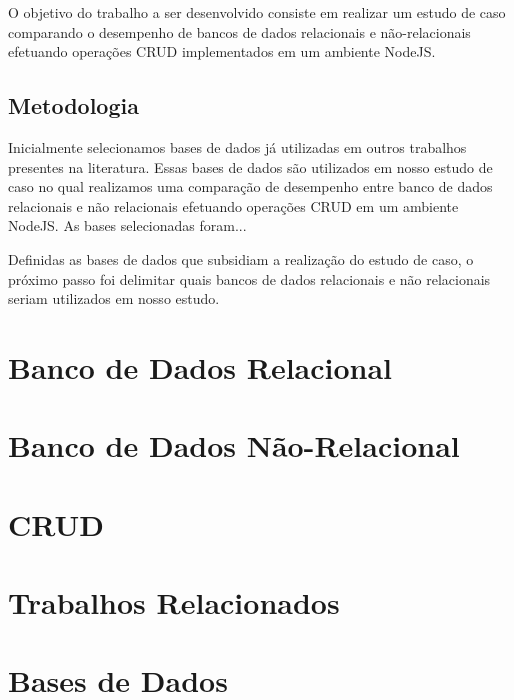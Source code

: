 \documentclass[a4paper,12pt,onecolumn,titlepage]{article}
\begin{document}
O objetivo do trabalho a ser desenvolvido consiste em realizar um estudo de caso comparando o desempenho de bancos de dados relacionais e não-relacionais efetuando operações CRUD implementados em um ambiente NodeJS.

\subsection{Metodologia}
\label{subsec:metodologia}

Inicialmente selecionamos bases de dados já utilizadas em outros trabalhos presentes na literatura. Essas bases de dados são utilizados em nosso estudo de caso no qual realizamos uma comparação de desempenho entre banco de dados relacionais e não relacionais efetuando operações CRUD em um ambiente NodeJS. As bases selecionadas foram...

Definidas as bases de dados que subsidiam a realização do estudo de caso, o próximo passo foi delimitar quais bancos de dados relacionais e não relacionais seriam utilizados em nosso estudo.


\section{Banco de Dados Relacional}
\label{sec:relacional}

\section{Banco de Dados Não-Relacional}
\label{sec:nao-relacional}

\section{CRUD}
\label{sec:crud}

\section{Trabalhos Relacionados}
\label{sec:relacionados}

\section{Bases de Dados}
\label{sec:bases}


\renewcommand{\refname}{Bibliografia}


\end{document}
